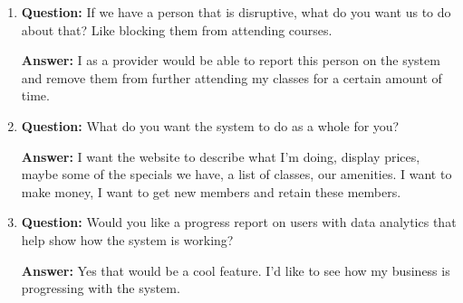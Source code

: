 \documentclass[12pt]{article}
\begin{document}
\begin{enumerate}
\item \textbf{Question:} If we have a person that is disruptive, what do you want us to do about that? Like blocking them from attending courses.

\textbf{Answer:}  I as a provider would be able to report this person on the system and remove them from further attending my classes for a certain amount of time. 

\item \textbf{Question:}  What do you want the system to do as a whole for you? 

\textbf{Answer:}  I want the website to describe what I’m doing, display prices, maybe some of the specials we have, a list of classes, our amenities.  I want to make money, I want to get new members and retain these members.  

\item \textbf{Question:}  Would you like a progress report on users with data analytics that help show how the system is working?

\textbf{Answer:}  Yes that would be a cool feature.  I’d like to see how my business is progressing with the system.
\end{enumerate}
\end{document}
